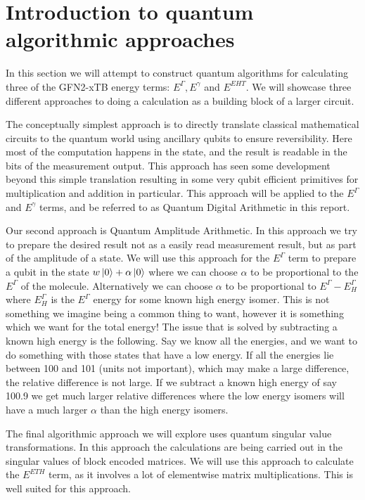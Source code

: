 \documentclass{article}
\begin{document}
\section{Introduction to quantum algorithmic approaches}
In this section we will attempt to construct quantum algorithms for calculating three of the GFN2-xTB\cite{bannwarth2019} energy terms: $E^\Gamma, E^\gamma$ and $E^{EHT}$.
We will showcase three different approaches to doing a calculation as a building block of a larger circuit.


The conceptually simplest approach is to directly translate classical mathematical circuits to the quantum world using ancillary qubits to ensure reversibility.
Here most of the computation happens in the state, and the result is readable in the bits of the measurement output.
This approach has seen some development beyond this simple translation resulting in some very qubit efficient primitives for multiplication and addition in particular\cite{draper2000,perez2017}.
This approach will be applied to the $E^\Gamma$ and $E^\gamma$ terms, and be referred to as Quantum Digital Arithmetic in this report. 


Our second approach is Quantum Amplitude Arithmetic\cite{wang2020}. 
In this approach we try to prepare the desired result not as a easily read measurement result, but as part of the amplitude of a state.
We will use this approach for the $E^\Gamma$ term to prepare a qubit in the state $w\ket{0}+\alpha\ket{0}$ where we can choose $\alpha$ to be proportional to the $E^\Gamma$ of the molecule.
Alternatively we can choose $\alpha$ to be proportional to $E^\Gamma-E^\Gamma_H$ where $E^\Gamma_H$ is the $E^\Gamma$ energy for some known high energy isomer.
This is not something we imagine being a common thing to want, however it is something which we want for the total energy! The issue that is solved by subtracting a known high energy is the following.
Say we know all the energies, and we want to do something with those states that have a low energy.
If all the energies lie between 100 and 101 (units not important), which may make a large difference, the relative difference is not large.
If we subtract a known high energy of say 100.9 we get much larger relative differences where the low energy isomers will have a much larger $\alpha$ than the high energy isomers. 


The final algorithmic approach we will explore uses quantum singular value transformations\cite{gilyen2019}.
In this approach the calculations are being carried out in the singular values of block encoded matrices. 
We will use this approach to calculate the $E^{ETH}$ term, as it involves a lot of elementwise matrix multiplications. 
This is well suited for this approach.
\end{document}
